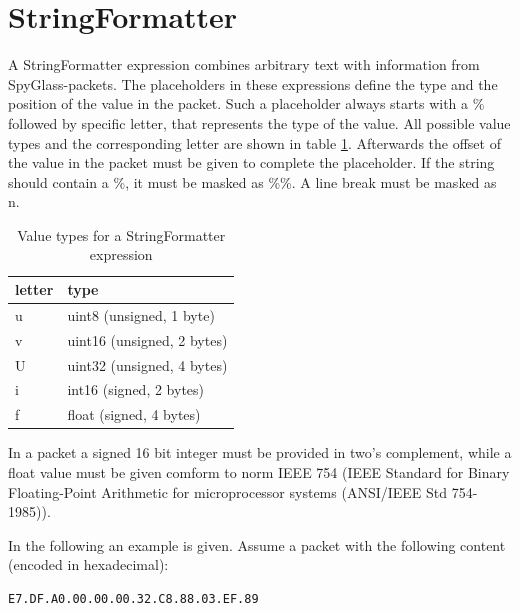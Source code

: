 \newpage
\section{StringFormatter}
\label{section:stringformatter}

A StringFormatter expression combines arbitrary text with information from SpyGlass-packets. The placeholders
in these expressions define the type and the position of the value in the packet. Such a placeholder always
starts with a \% followed by specific letter, that represents the type of the value. All possible value types
and the corresponding letter are shown in table \ref{table:stringformatter_types}. Afterwards the
offset of the value in the packet must be given to complete the placeholder. If the string should contain
a \%, it must be masked as \%\%. A line break must be masked as \\n.

\begin{table}[htdp]
  \begin{center}
    \begin{tabular}{l|l}
      \textbf{letter} & \textbf{type}\\
      \hline
      \hline
      u & uint8 (unsigned, 1 byte) \\
      \hline
      v & uint16 (unsigned, 2 bytes) \\
      \hline
      U & uint32 (unsigned, 4 bytes)\\
      \hline
      i & int16 (signed, 2 bytes)\\
      \hline
      f & float (signed, 4 bytes)\\
    \end{tabular}
    \caption{Value types for a StringFormatter expression}
    \label{table:stringformatter_types}
  \end{center}
\end{table}

In a packet a signed 16 bit integer must be provided in two's complement, while a float value must be given comform to norm
IEEE 754 (IEEE Standard for Binary Floating-Point Arithmetic for microprocessor systems (ANSI/IEEE Std 754-1985)).

In the following an example is given. Assume a packet with the following content (encoded in hexadecimal):

\begin{verbatim}
E7.DF.A0.00.00.00.32.C8.88.03.EF.89
\end{verbatim}


